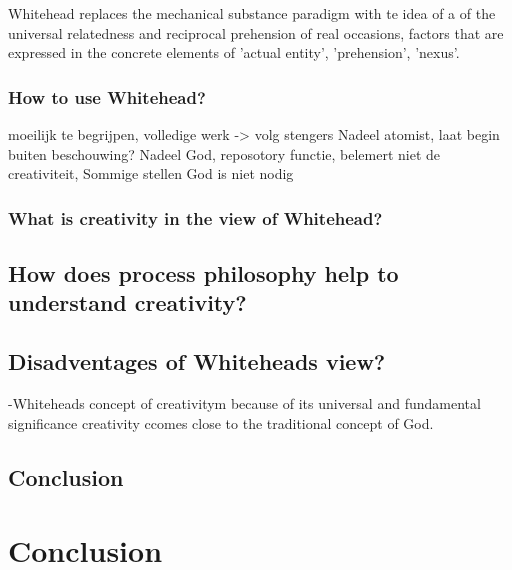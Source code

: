 Whitehead replaces the mechanical substance paradigm with te idea of a of 
the universal relatedness and reciprocal prehension of real occasions, factors that are expressed in the concrete elements of 'actual entity', 'prehension', 'nexus'.






\subsubsection{How to use Whitehead?}
moeilijk te begrijpen, volledige werk -> volg stengers
Nadeel atomist, laat begin buiten beschouwing?
Nadeel God, reposotory functie, belemert niet de creativiteit, Sommige stellen God is niet nodig
\subsubsection{What is creativity in the view of Whitehead?}	

\subsection{How does process philosophy help to understand creativity?}
\subsection{Disadventages of Whiteheads view?}
-Whiteheads concept of creativitym because of its universal and fundamental significance creativity ccomes close to the traditional concept of God.

\subsection{Conclusion}

\section{Conclusion}
